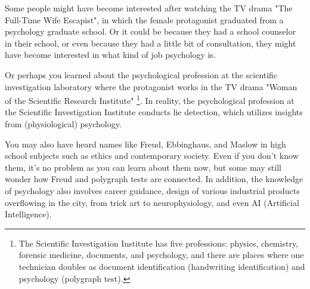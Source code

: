\documentclass{ltjsbook}
\begin{document}
Some people might have become interested after watching the TV drama "The Full-Time Wife Escapist", in which the female protagonist graduated from a psychology graduate school. Or it could be because they had a school counselor in their school, or even because they had a little bit of consultation, they might have become interested in what kind of job psychology is.

Or perhaps you learned about the psychological profession at the scientific investigation laboratory where the protagonist works in the TV drama "Woman of the Scientific Research Institute" \footnote{The Scientific Investigation Institute has five professions: physics, chemistry, forensic medicine, documents, and psychology, and there are places where one technician doubles as document identification (handwriting identification) and psychology (polygraph test).}. In reality, the psychological profession at the Scientific Investigation Institute conducts lie detection, which utilizes insights from (physiological) psychology.

You may also have heard names like Freud, Ebbinghaus, and Maslow in high school subjects such as ethics and contemporary society. Even if you don't know them, it's no problem as you can learn about them now, but some may still wonder how Freud and polygraph tests are connected. In addition, the knowledge of psychology also involves career guidance, design of various industrial products overflowing in the city, from trick art to neurophysiology, and even AI (Artificial Intelligence).
\end{document}
